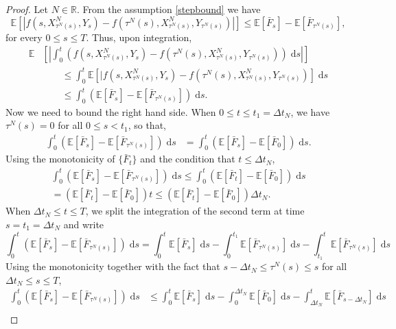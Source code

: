\documentclass[reqno,12pt]{amsart}
\theoremstyle{plain}%
\theoremstyle{definition}
\begin{document}
\begin{proof}
    Let $N\in \mathbb{R}$. From the assumption \eqref{stepbound} we have
    \[
        \mathbb{E}\left[|f(s, X_{\tau^N(s)}^N, Y_s) - f(\tau^N(s), X_{\tau^N(s)}^N, Y_{\tau^N(s)})|\right] \leq \mathbb{E}[\bar F_s] - \mathbb{E}[\bar F_{\tau^N(s)}],
    \]
    for every $0\leq s \leq T$. Thus, upon integration,
    \begin{align*}
        \mathbb{E}&\left[\left|\int_0^t \left( f(s, X_{\tau^N(s)}^N, Y_s) - f(\tau^N(s), X_{\tau^N(s)}^N, Y_{\tau^N(s)}) \right)\;\mathrm{d}s\right|\right] \\
        & \qquad \leq \int_0^t \mathbb{E}\left[|f(s, X_{\tau^N(s)}^N, Y_s) - f(\tau^N(s), X_{\tau^N(s)}^N, Y_{\tau^N(s)}) \right]\;\mathrm{d}s \\
        & \qquad \leq \int_0^t \left(\mathbb{E}[\bar F_s] - \mathbb{E}[\bar F_{\tau^N(s)}]\right)\;\mathrm{d}s.
    \end{align*}
    Now we need to bound the right hand side. When $0 \leq t\leq t_1 = \Delta t_N$, we have $\tau^N(s) = 0$ for all $0 \leq s < t_1$, so that,
    \begin{align*}
      \int_0^t (\mathbb{E}[\bar F_s] - \mathbb{E}[\bar F_{\tau^N(s)}])\;\mathrm{d}s & = \int_0^t (\mathbb{E}[\bar F_s] - \mathbb{E}[\bar F_{0}]) \;\mathrm{d}s.
    \end{align*}
    Using the monotonicity of $\{\bar F_t\}$ and the condition that $t \leq \Delta t_N$,
    \begin{multline*}
      \int_0^t (\mathbb{E}[\bar F_s] - \mathbb{E}[\bar F_{\tau^N(s)}])\;\mathrm{d}s \leq \int_0^t (\mathbb{E}[\bar F_t] - \mathbb{E}[\bar F_0]) \;\mathrm{d}s  \\
      = (\mathbb{E}[\bar F_t] - \mathbb{E}[\bar F_0])t \leq (\mathbb{E}[\bar F_t] - \mathbb{E}[\bar F_0])\Delta t_N.
    \end{multline*}
    When $\Delta t_N\leq t \leq T$, we split the integration of the second term at time $s = t_1 = \Delta t_N$ and write
    \[ 
      \int_0^t (\mathbb{E}[\bar F_s] - \mathbb{E}[\bar F_{\tau^N(s)}])\;\mathrm{d}s = \int_0^t \mathbb{E}[\bar F_s] \;\mathrm{d}s - \int_0^{t_1} \mathbb{E}[\bar F_{\tau^N(s)}]\;\mathrm{d}s - \int_{t_1}^t \mathbb{E}[\bar F_{\tau^N(s)}]\;\mathrm{d}s
    \]
    Using the monotonicity together with the fact that $s - \Delta t_N\leq \tau^N(s) \leq s$ for all $\Delta t_N\leq s \leq T$,
    \begin{align*}
        \int_0^t (\mathbb{E}[\bar F_s] - \mathbb{E}[\bar F_{\tau^N(s)}])\;\mathrm{d}s & \leq \int_0^t \mathbb{E}[\bar F_s] \;\mathrm{d}s - \int_0^{\Delta t_N} \mathbb{E}[\bar F_0]\;\mathrm{d}s - \int_{\Delta t_N}^t \mathbb{E}[\bar F_{s-\Delta t_N}]\;\mathrm{d}s \\

\end{align*}
\end{proof}
\end{document}
